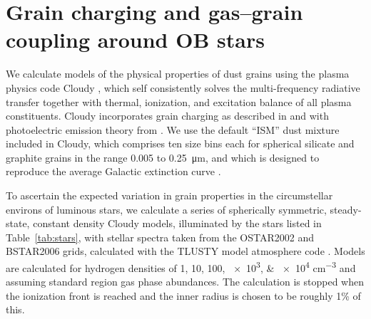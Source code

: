 
\section{Grain charging and gas--grain coupling around OB stars}
\label{sec:cloudy-models-dust}

We calculate models of the physical properties of dust grains using
the plasma physics code Cloudy \citep{Ferland:2013a, Ferland:2017a},
which self consistently solves the multi-frequency radiative transfer
together with thermal, ionization, and excitation balance of all
plasma constituents.  Cloudy incorporates grain charging as described
in \citet{Baldwin:1991a} and \citet{van-Hoof:2004a} with photoelectric
emission theory from \citet{Weingartner:2001b, Weingartner:2006a}.  We
use the default ``ISM'' dust mixture included in Cloudy, which
comprises ten size bins each for spherical silicate and graphite
grains in the range \num{0.005} to \SI{0.25}{\um}, and which is
designed to reproduce the average Galactic extinction curve
\citep{Weingartner:2001a, Abel:2008a}.

To ascertain the expected variation in grain properties in the
circumstellar environs of luminous stars, we calculate a series of
spherically symmetric, steady-state, constant density Cloudy models,
illuminated by the stars listed in Table~\ref{tab:stars}, with stellar
spectra taken from the OSTAR2002 and BSTAR2006 grids, calculated with
the TLUSTY model atmosphere code \citep{Lanz:2003a, Lanz:2007a}.
Models are calculated for hydrogen densities of
\numlist{1;10;100;e3;e4} \si{cm^{-3}} and assuming standard \hii{} region
gas phase abundances.  The calculation is stopped when the ionization
front is reached and the inner radius is chosen to be roughly 1\% of this. 



